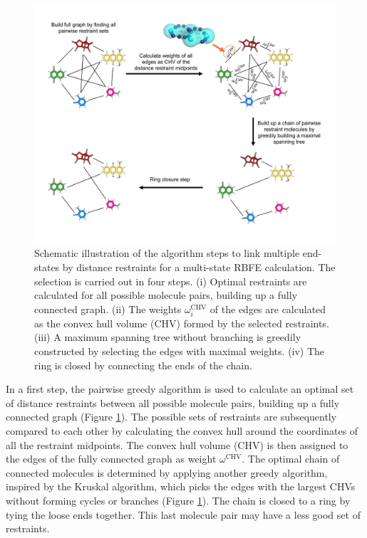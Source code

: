 \begin{figure}[h!]
    \centering
    \includegraphics[width=\textwidth]{fig/theory/MultistateExpansion.png}
    \caption{Schematic illustration of the algorithm steps to link multiple end-states by distance restraints for a multi-state RBFE calculation. The selection is carried out in four steps. (i) Optimal restraints are calculated for all possible molecule pairs, building up a fully connected graph. (ii) The weights $\omega^\text{CHV}_i$ of the edges are calculated as the convex hull volume (CHV) formed by the selected restraints. (iii) A maximum spanning tree without branching is greedily constructed by selecting the edges with maximal weights. (iv) The ring is closed by connecting the ends of the chain.}
    \label{fig: convexHull}
\end{figure}

In a first step, the pairwise greedy algorithm is used to calculate an optimal set of distance restraints between all possible molecule pairs, building up a fully connected graph (Figure \ref{fig: convexHull}). The possible sets of restraints are subsequently compared to each other by calculating the convex hull around the coordinates of all the restraint midpoints. The convex hull volume (CHV) is then assigned to the edges of the fully connected graph as weight $\omega^\text{CHV}$. The optimal chain of connected molecules is determined by applying another greedy algorithm, inspired by the Kruskal algorithm,\cite{Kruskal1956} which picks the edges with the largest CHVs without forming cycles or branches (Figure \ref{fig: convexHull}). The chain is closed to a ring by tying the loose ends together. This last molecule pair may have a less good set of restraints.

